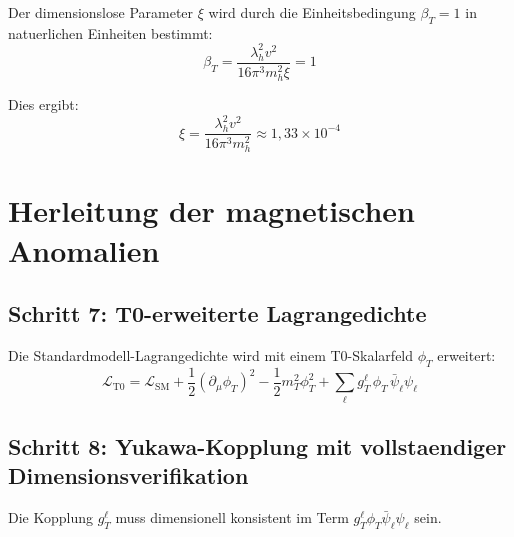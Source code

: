 \documentclass[12pt,a4paper]{article}
\begin{document}
	Der dimensionslose Parameter $\xi$ wird durch die Einheitsbedingung $\beta_T = 1$ in natuerlichen Einheiten bestimmt:
	\begin{equation}
		\beta_T = \frac{\lambda_h^2 v^2}{16\pi^3 m_h^2 \xi} = 1
	\end{equation}
	
	Dies ergibt:
	\begin{equation}
		\xi = \frac{\lambda_h^2 v^2}{16\pi^3 m_h^2} \approx 1{,}33 \times 10^{-4}
		\label{eq:xi_value}
	\end{equation}
	
	\section{Herleitung der magnetischen Anomalien}
	
	\subsection{Schritt 7: T0-erweiterte Lagrangedichte}
	
	Die Standardmodell-Lagrangedichte wird mit einem T0-Skalarfeld $\phi_T$ erweitert:
	\begin{equation}
		\mathcal{L}_{\text{T0}} = \mathcal{L}_{\text{SM}} + \frac{1}{2}(\partial_\mu \phi_T)^2 - \frac{1}{2} m_T^2 \phi_T^2 + \sum_\ell g_T^\ell \, \phi_T \, \bar{\psi}_\ell \psi_\ell
		\label{eq:lagrangian}
	\end{equation}
	
	\subsection{Schritt 8: Yukawa-Kopplung mit vollstaendiger Dimensionsverifikation}
	
	Die Kopplung $g_T^\ell$ muss dimensionell konsistent im Term $g_T^\ell \phi_T \bar{\psi}_\ell \psi_\ell$ sein.
	
\end{document}
